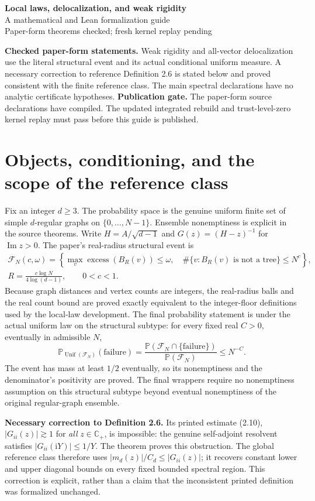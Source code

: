 \documentclass[11pt]{article}
\newcommand{\code}[1]{\texttt{\small\detokenize{#1}}}
\newcommand{\PP}{\mathbb P}
\newcommand{\F}{\mathcal F}
\newcommand{\im}{\operatorname{Im}}
\newif\ifIntegratedAudit
\newcommand{\auditstatus}{\ifIntegratedAudit Paper-form theorems and independent kernel replay checked\else Paper-form theorems checked; fresh kernel replay pending\fi}
\newcommand{\publicationstatus}{\ifIntegratedAudit
\textbf{Validation.} The independent integrated rebuild and trust-level-zero kernel replay have passed.
\else
\textbf{Publication gate.} The paper-form source declarations have compiled. The updated
integrated rebuild and trust-level-zero kernel replay must pass before this guide is published.
\fi}
\begin{document}
\begin{center}
  {\LARGE\bfseries Local laws, delocalization, and weak rigidity}\\[5pt]
  {\large A mathematical and Lean formalization guide}\\[5pt]
  {\small \auditstatus}
\end{center}

\colorbox{gray!10}{\parbox{\dimexpr\linewidth-2\fboxsep}{\small
\textbf{Checked paper-form statements.} Weak rigidity and all-vector delocalization use the
literal structural event and its actual conditional uniform measure. A necessary correction
to reference Definition 2.6 is stated below and proved consistent with the finite reference
class. The main spectral declarations have no analytic certificate hypotheses. \publicationstatus}}

\section{Objects, conditioning, and the scope of the reference class}

Fix an integer $d\geq3$. The probability space is the genuine uniform finite set of simple
$d$-regular graphs on $\{0,\ldots,N-1\}$. Ensemble nonemptiness is explicit in the source
theorems. Write $H=A/\sqrt{d-1}$ and $G(z)=(H-z)^{-1}$ for $\im z>0$.
The paper's real-radius structural event is
\[
 \begin{gathered}
 \F_N(c,\omega)=\left\{\max_v\operatorname{excess}(B_R(v))\leq\omega,
 \quad\#\{v:B_R(v)\text{ is not a tree}\}\leq N^c\right\},\\[2pt]
 R=\frac{c\log N}{4\log(d-1)},\qquad 0<c<1.
 \end{gathered}
\]
Because graph distances and vertex counts are integers, the real-radius balls and the
real count bound are proved exactly equivalent to the integer-floor definitions used by
the local-law development. The final probability statement is under the actual uniform
law on the structural subtype: for every fixed real $C>0$, eventually in admissible $N$,
\[
 \PP_{\operatorname{Unif}(\F_N)}(\text{failure})
 =\frac{\PP(\F_N\cap\{\text{failure}\})}{\PP(\F_N)}\leq N^{-C}.
 \tag{1}
\]
The event has mass at least $1/2$ eventually, so its nonemptiness and the denominator's
positivity are proved. The final wrappers require no nonemptiness assumption on this
structural subtype beyond eventual nonemptiness of the original regular-graph ensemble.

\textbf{Necessary correction to Definition 2.6.}
Its printed estimate (2.10), $|G_{ii}(z)|\gtrsim1$ for \emph{all} $z\in\mathbb C_+$, is impossible:
the genuine self-adjoint resolvent satisfies $|G_{ii}(\mathrm iY)|\leq1/Y$.
The theorem \code{no_global_positive_diagonal_lower_bound} proves this obstruction.
The global reference class therefore uses
$|m_d(z)|/C_d\leq |G_{ii}(z)|$; it recovers constant lower and upper diagonal bounds on
every fixed bounded spectral region. This correction is explicit, rather than a claim that
the inconsistent printed definition was formalized unchanged.
\end{document}
